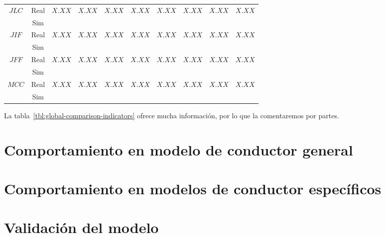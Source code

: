 \begin{table*}
\begin{tabular}{cccccccccc}
		\multirow{2}{*}{\textbf{$JLC$}} & Real & \multicolumn{1}{c}{$X.XX$} & $X.XX$   & \multicolumn{1}{c}{$X.XX$}       & $X.XX$   & \multicolumn{1}{c}{$X.XX$}     & $X.XX$   & \multicolumn{1}{c}{$X.XX$}     & $X.XX$   \\
		& Sim  &                            &          &                                  &          &                                &          &                                &          \\
		\multirow{2}{*}{\textbf{$JIF$}} & Real & \multicolumn{1}{c}{$X.XX$} & $X.XX$   & \multicolumn{1}{c}{$X.XX$}       & $X.XX$   & \multicolumn{1}{c}{$X.XX$}     & $X.XX$   & \multicolumn{1}{c}{$X.XX$}     & $X.XX$   \\
		& Sim  &                            &          &                                  &          &                                &          &                                &          \\
		\multirow{2}{*}{\textbf{$JFF$}} & Real & \multicolumn{1}{c}{$X.XX$} & $X.XX$   & \multicolumn{1}{c}{$X.XX$}       & $X.XX$   & \multicolumn{1}{c}{$X.XX$}     & $X.XX$   & \multicolumn{1}{c}{$X.XX$}     & $X.XX$   \\
		& Sim  &                            &          &                                  &          &                                &          &                                &          \\
		\multirow{2}{*}{\textbf{$MCC$}} & Real & \multicolumn{1}{c}{$X.XX$} & $X.XX$   & \multicolumn{1}{c}{$X.XX$}       & $X.XX$   & \multicolumn{1}{c}{$X.XX$}     & $X.XX$   & \multicolumn{1}{c}{$X.XX$}     & $X.XX$   \\
		& Sim  &                            &          &                                  &          &                                &          &                                &         
	\end{tabular}
\end{table*}

La tabla~\ref{tbl:global-comparison-indicators} ofrece mucha información, por lo que la comentaremos por partes.

\section{Comportamiento en modelo de conductor general}


\section{Comportamiento en modelos de conductor específicos}


\section{Validación del modelo}

